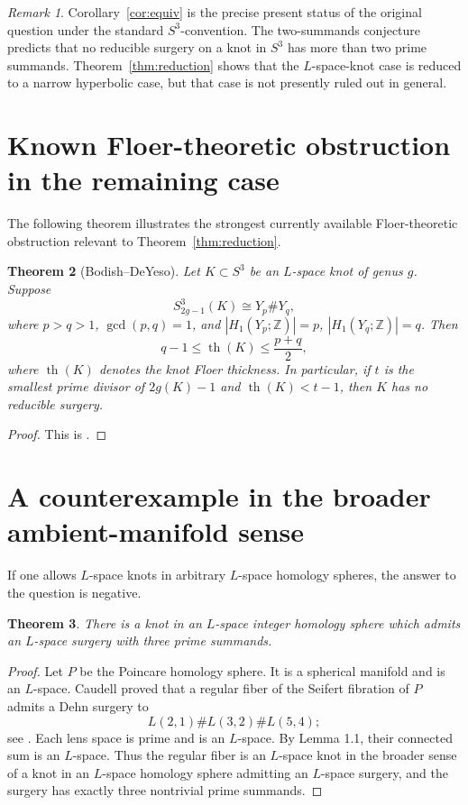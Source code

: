 \documentclass[11pt]{article}
\newtheorem{theorem}{Theorem}[section]
\theoremstyle{definition}
\theoremstyle{remark}
\newtheorem{remark}[theorem]{Remark}
\newcommand{\Z}{\mathbb Z}
\begin{document}
\begin{remark}
Corollary~\ref{cor:equiv} is the precise present status of the original
question under the standard \(S^{3}\)-convention.  The two-summands
conjecture predicts that no reducible surgery on a knot in \(S^{3}\) has more
than two prime summands.  Theorem~\ref{thm:reduction} shows that the
\(L\)-space-knot case is reduced to a narrow hyperbolic case, but that case is
not presently ruled out in general.
\end{remark}

\section{Known Floer-theoretic obstruction in the remaining case}

The following theorem illustrates the strongest currently available
Floer-theoretic obstruction relevant to Theorem~\ref{thm:reduction}.

\begin{theorem}[Bodish--DeYeso]\label{thm:BD}
Let \(K\subset S^{3}\) be an \(L\)-space knot of genus \(g\).  Suppose
\[
        S^{3}_{2g-1}(K)\cong Y_{p}\#Y_{q},
\]
where \(p>q>1\), \(\gcd(p,q)=1\), and
\(|H_{1}(Y_{p};\Z)|=p\), \(|H_{1}(Y_{q};\Z)|=q\).  Then
\[
        q-1\le \operatorname{th}(K)\le \frac{p+q}{2},
\]
where \(\operatorname{th}(K)\) denotes the knot Floer thickness.  In particular,
if \(t\) is the smallest prime divisor of \(2g(K)-1\) and
\(\operatorname{th}(K)<t-1\), then \(K\) has no reducible surgery.
\end{theorem}

\begin{proof}
This is \cite[Theorem 1.9 and Corollary 1.11]{BodishDeYeso}.
\end{proof}

\section{A counterexample in the broader ambient-manifold sense}

If one allows \(L\)-space knots in arbitrary \(L\)-space homology spheres, the
answer to the question is negative.

\begin{theorem}\label{thm:counterexample}
There is a knot in an \(L\)-space integer homology sphere which admits an
\(L\)-space surgery with three prime summands.
\end{theorem}

\begin{proof}
Let \(P\) be the Poincare homology sphere.  It is a spherical manifold and is
an \(L\)-space.  Caudell proved that a regular fiber of the Seifert fibration
of \(P\) admits a Dehn surgery to
\[
        L(2,1)\#L(3,2)\#L(5,4);
\]
see \cite{Caudell}.  Each lens space is prime and is an \(L\)-space.  By
Lemma 1.1, their connected sum is an \(L\)-space.  Thus the regular fiber is
an \(L\)-space knot in the broader sense of a knot in an \(L\)-space homology
sphere admitting an \(L\)-space surgery, and the surgery has exactly three
nontrivial prime summands.
\end{proof}
\end{document}

